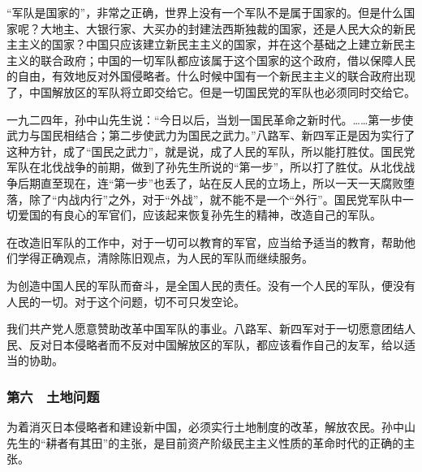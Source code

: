 “军队是国家的”，非常之正确，世界上没有一个军队不是属于国家的。但是什么国家呢？大地主、大银行家、大买办的封建法西斯独裁的国家，还是人民大众的新民主主义的国家？中国只应该建立新民主主义的国家，并在这个基础之上建立新民主主义的联合政府；中国的一切军队都应该属于这个国家的这个政府，借以保障人民的自由，有效地反对外国侵略者。什么时候中国有一个新民主主义的联合政府出现了，中国解放区的军队将立即交给它。但是一切国民党的军队也必须同时交给它。

一九二四年，孙中山先生说：“今日以后，当划一国民革命之新时代。……第一步使武力与国民相结合；第二步使武力为国民之武力。”八路军、新四军正是因为实行了这种方针，成了“国民之武力”，就是说，成了人民的军队，所以能打胜仗。国民党军队在北伐战争的前期，做到了孙先生所说的“第一步”，所以打了胜仗。从北伐战争后期直至现在，连“第一步”也丢了，站在反人民的立场上，所以一天一天腐败堕落，除了“内战内行”之外，对于“外战”，就不能不是一个“外行”。国民党军队中一切爱国的有良心的军官们，应该起来恢复孙先生的精神，改造自己的军队。

在改造旧军队的工作中，对于一切可以教育的军官，应当给予适当的教育，帮助他们学得正确观点，清除陈旧观点，为人民的军队而继续服务。

为创造中国人民的军队而奋斗，是全国人民的责任。没有一个人民的军队，便没有人民的一切。对于这个问题，切不可只发空论。

我们共产党人愿意赞助改革中国军队的事业。八路军、新四军对于一切愿意团结人民、反对日本侵略者而不反对中国解放区的军队，都应该看作自己的友军，给以适当的协助。

\subsubsection{第六　土地问题}

为着消灭日本侵略者和建设新中国，必须实行土地制度的改革，解放农民。孙中山先生的“耕者有其田”的主张，是目前资产阶级民主主义性质的革命时代的正确的主张。

